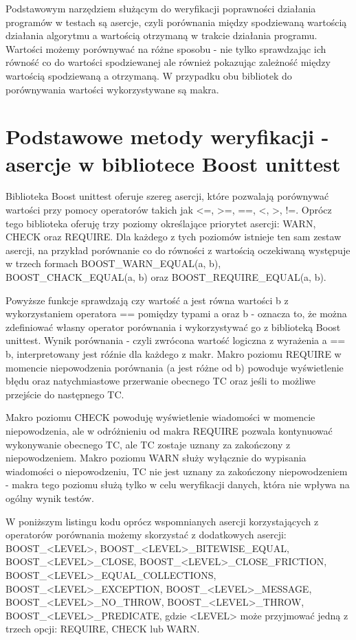 \documentclass[12pt,a4paper,notitlepage]{report}
\begin{document}
Podstawowym narzędziem służącym do weryfikacji poprawności działania programów w testach są asercje, czyli porównania między spodziewaną wartością działania algorytmu a wartością otrzymaną w trakcie działania programu.
Wartości możemy porównywać na różne sposobu - nie tylko sprawdzając ich równość co do wartości spodziewanej ale również pokazując zależność między wartością spodziewaną a otrzymaną. W przypadku obu bibliotek do porównywania wartości wykorzystywane są makra.

\section{Podstawowe metody weryfikacji - asercje w bibliotece Boost unittest}

Biblioteka Boost unittest oferuje szereg asercji, które pozwalają porównywać wartości przy pomocy operatorów takich jak <=, >=, ==, <, >, !=. Oprócz tego biblioteka oferuję trzy poziomy określające priorytet asercji: WARN, CHECK oraz REQUIRE. Dla każdego z tych poziomów istnieje ten sam zestaw asercji, na przykład porównanie co do równości z wartością oczekiwaną występuje w trzech formach BOOST{\_}WARN{\_}EQUAL(a, b), BOOST{\_}CHACK{\_}EQUAL(a, b) oraz BOOST{\_}REQUIRE{\_}EQUAL(a, b).

Powyższe funkcje sprawdzają czy wartość a jest równa wartości b z wykorzystaniem operatora == pomiędzy typami a oraz b - oznacza to, że można zdefiniować własny operator porównania i wykorzystywać go z biblioteką Boost unittest. 
Wynik porównania - czyli zwrócona wartość logiczna z wyrażenia a == b, interpretowany jest róźnie dla każdego z makr. Makro poziomu REQUIRE w momencie niepowodzenia porównania (a jest różne od b) powoduje wyświetlenie błędu oraz natychmiastowe przerwanie obecnego TC oraz jeśli to możliwe przejście do następnego TC.

Makro poziomu CHECK powoduję wyświetlenie wiadomości w momencie niepowodzenia, ale w odróżnieniu od makra REQUIRE pozwala kontynuować wykonywanie obecnego TC, ale TC zostaje uznany za zakończony z niepowodzeniem.
Makro poziomu WARN służy wyłącznie do wypisania wiadomości o niepowodzeniu, TC nie jest uznany za zakończony niepowodzeniem - makra tego poziomu służą tylko w celu weryfikacji danych, która nie wpływa na ogólny wynik testów.

W poniższym listingu kodu oprócz wspomnianych asercji korzystających z operatorów porównania możemy skorzystać z dodatkowych asercji: BOOST{\_}<LEVEL>, BOOST{\_}<LEVEL>{\_}BITEWISE{\_}EQUAL, BOOST{\_}<LEVEL>{\_}CLOSE, BOOST{\_}<LEVEL>{\_}CLOSE{\_}FRICTION, BOOST{\_}<LEVEL>{\_}EQUAL{\_}COLLECTIONS, BOOST{\_}<LEVEL>{\_}EXCEPTION, BOOST{\_}<LEVEL>{\_}MESSAGE, BOOST{\_}<LEVEL>{\_}NO{\_}THROW, BOOST{\_}<LEVEL>{\_}THROW, BOOST{\_}<LEVEL>{\_}PREDICATE, gdzie <LEVEL> może przyjmować jedną z trzech opcji: REQUIRE, CHECK lub WARN.
\end{document}
